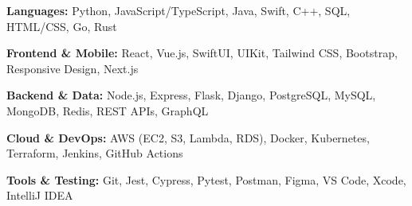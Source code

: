 \noindent\textbf{Languages:} Python, JavaScript/TypeScript, Java, Swift, C++, SQL, HTML/CSS, Go, Rust

\noindent\textbf{Frontend \& Mobile:} React, Vue.js, SwiftUI, UIKit, Tailwind CSS, Bootstrap, Responsive Design, Next.js

\noindent\textbf{Backend \& Data:} Node.js, Express, Flask, Django, PostgreSQL, MySQL, MongoDB, Redis, REST APIs, GraphQL

\noindent\textbf{Cloud \& DevOps:} AWS (EC2, S3, Lambda, RDS), Docker, Kubernetes, Terraform, Jenkins, GitHub Actions

\noindent\textbf{Tools \& Testing:} Git, Jest, Cypress, Pytest, Postman, Figma, VS Code, Xcode, IntelliJ IDEA